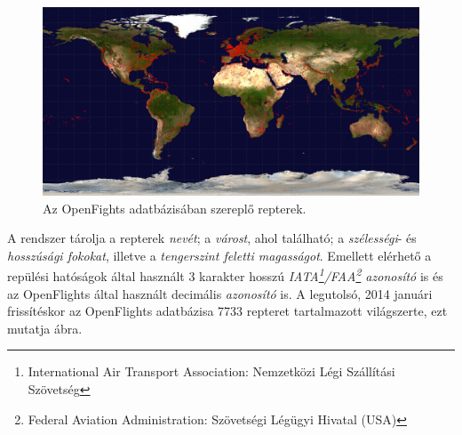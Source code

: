     \begin{figure}[!ht]
      \centering
      \includegraphics[width=150mm,keepaspectratio=true]{./figures/airports-2048.png}
      
      \caption{Az OpenFights adatbázisában szereplő repterek.}
      \label{fig:figure_repterek}
    \end{figure}

    A rendszer tárolja a repterek \emph{nevét}; a \emph{várost}, ahol található; a \emph{szélességi}- és \emph{hosszúsági fokokat}, illetve a \emph{tengerszint feletti magasságot}. Emellett elérhető a repülési hatóságok által használt 3 karakter hosszú \emph{IATA\footnote{International Air Transport Association: Nemzetközi Légi Szállítási Szövetség}/FAA\footnote{Federal Aviation Administration: Szövetségi Légügyi Hivatal (USA)} azonosító} is és az OpenFlights által használt decimális \emph{azonosító} is. A legutolsó, 2014 januári frissítéskor az OpenFlights adatbázisa 7733 repteret tartalmazott világszerte, ezt mutatja  ábra.

